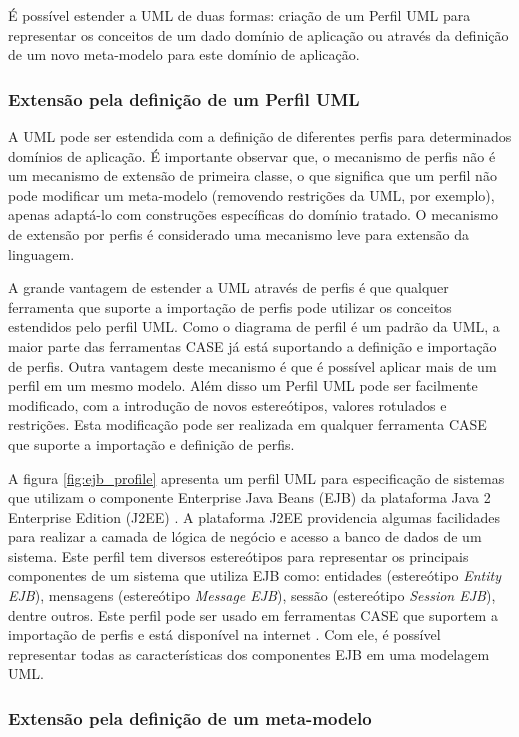 É possível estender a UML de duas formas: criação de um Perfil UML para representar os conceitos de um dado domínio de aplicação ou através da
definição de um novo meta-modelo para este domínio de aplicação.

\subsubsection{Extensão pela definição de um Perfil UML}

A UML pode ser estendida com a definição de diferentes perfis para determinados domínios de aplicação. É importante observar que, o mecanismo de
perfis não é um mecanismo de extensão de primeira classe, o que significa que um perfil não pode modificar um meta-modelo (removendo restrições da
UML, por exemplo), apenas adaptá-lo com construções específicas do domínio tratado. O mecanismo de extensão por perfis é considerado uma mecanismo
leve para extensão da linguagem.

A grande vantagem de estender a UML através de perfis é que qualquer ferramenta que suporte a importação de perfis pode utilizar os conceitos
estendidos pelo perfil UML. Como o diagrama de perfil é um padrão da UML, a maior parte das ferramentas CASE já está suportando a definição e
importação de perfis. Outra vantagem deste mecanismo é que é possível aplicar mais de um perfil em um mesmo
modelo. Além disso um Perfil UML pode ser facilmente modificado, com a introdução de novos estereótipos, valores rotulados e restrições. Esta
modificação pode ser realizada em qualquer ferramenta CASE que suporte a importação e definição de perfis.

A figura \ref{fig:ejb_profile} apresenta um perfil UML para especificação de sistemas que utilizam o componente Enterprise Java Beans (EJB)
\cite{ejb:12} da plataforma Java 2 Enterprise Edition (J2EE) \cite{j2ee:12}. A plataforma J2EE providencia algumas facilidades para realizar a camada
de lógica de negócio e acesso a banco de dados de um sistema. Este perfil tem diversos estereótipos para representar os principais componentes de um
sistema que utiliza EJB como: entidades (estereótipo \textit{Entity EJB}), mensagens (estereótipo \textit{Message EJB}), sessão (estereótipo
\textit{Session EJB}), dentre outros. Este perfil pode ser usado em ferramentas CASE que suportem a importação de perfis e está disponível na internet
\cite{ejbprofile:12}. Com ele, é possível representar todas as características dos componentes EJB em uma modelagem UML.

\subsubsection{Extensão pela definição de um meta-modelo}

